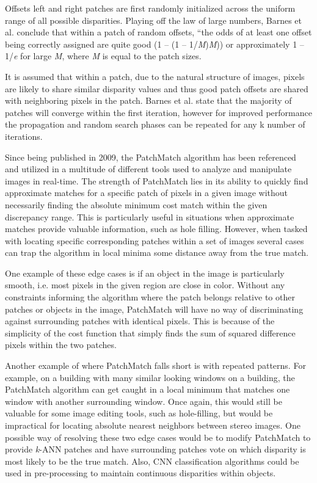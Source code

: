 \documentclass{article}
\begin{document}
Offsets left and right patches are first randomly initialized across the uniform range of all possible disparities. Playing off the law of large numbers, Barnes et al. \citep{barnes2009patchmatch} conclude that within a patch of random offsets, “the odds of at least one offset being correctly assigned are quite good (1 – (1 – 1/\textit{M})\textit{M})) or approximately 1 – 1/\textit{e} for large \textit{M}, where \textit{M} is equal to the patch sizes.

It is assumed that within a patch, due to the natural structure of images, pixels are likely to share similar disparity values and thus good patch offsets are shared with neighboring pixels in the patch. Barnes et al. \citep{barnes2009patchmatch} state that the majority of patches will converge within the first iteration, however for improved performance the propagation and random search phases can be repeated for any k number of iterations.

Since being published in 2009, the PatchMatch algorithm \citep{barnes2009patchmatch} has been referenced and utilized in a multitude of different tools used to analyze and manipulate images in real-time. The strength of PatchMatch lies in its ability to quickly find approximate matches for a specific patch of pixels in a given image without necessarily finding the absolute minimum cost match within the given discrepancy range. This is particularly useful in situations when approximate matches provide valuable information, such as hole filling. However, when tasked with locating specific corresponding patches within a set of images several cases can trap the algorithm in local minima some distance away from the true match.

One example of these edge cases is if an object in the image is particularly smooth, i.e. most pixels in the given region are close in color. Without any constraints informing the algorithm where the patch belongs relative to other patches or objects in the image, PatchMatch will have no way of discriminating against surrounding patches with identical pixels. This is because of the simplicity of the cost function that simply finds the sum of squared difference pixels within the two patches.

Another example of where PatchMatch falls short is with repeated patterns. For example, on a building with many similar looking windows on a building, the PatchMatch algorithm can get caught in a local minimum that matches one window with another surrounding window. Once again, this would still be valuable for some image editing tools, such as hole-filling, but would be impractical for locating absolute nearest neighbors between stereo images. One possible way of resolving these two edge cases would be to modify PatchMatch to provide \textit{k}-ANN patches and have surrounding patches vote on which disparity is most likely to be the true match. Also, CNN classification algorithms could be used in pre-processing to maintain continuous disparities within objects.
\end{document}
